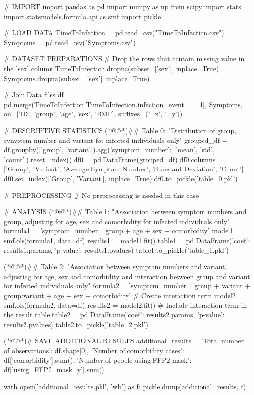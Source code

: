 \documentclass[11pt]{article}
\begin{document}
\begin{python}

# IMPORT
import pandas as pd
import numpy as np
from scipy import stats
import statsmodels.formula.api as smf
import pickle

# LOAD DATA
TimeToInfection = pd.read_csv("TimeToInfection.csv")
Symptoms = pd.read_csv("Symptoms.csv")

# DATASET PREPARATIONS
# Drop the rows that contain missing value in the 'sex' column
TimeToInfection.dropna(subset=['sex'], inplace=True)
Symptoms.dropna(subset=['sex'], inplace=True)

# Join Data files
df = pd.merge(TimeToInfection[TimeToInfection.infection_event == 1], Symptoms, on=['ID', 'group', 'age', 'sex', 'BMI'], suffixes=('_x', '_y'))

# DESCRIPTIVE STATISTICS
(*@@*)## Table 0: "Distribution of group, symptom number and variant for infected individuals only"
grouped_df = df.groupby(['group', 'variant']).agg({'symptom_number': ['mean', 'std', 'count']}).reset_index()
df0 = pd.DataFrame(grouped_df)
df0.columns = ['Group', 'Variant', 'Average Symptom Number', 'Standard Deviation', 'Count']
df0.set_index(['Group', 'Variant'], inplace=True)
df0.to_pickle('table_0.pkl')

# PREPROCESSING
# No preprocessing is needed in this case

# ANALYSIS
(*@@*)## Table 1: "Association between symptom numbers and group, adjusting for age, sex and comorbidity for infected individuals only"
formula1 = 'symptom_number ~ group + age + sex + comorbidity'
model1 = smf.ols(formula1, data=df)
results1 = model1.fit()
table1 = pd.DataFrame({'coef': results1.params, 'p-value': results1.pvalues})
table1.to_pickle('table_1.pkl')

(*@@*)## Table 2: "Association between symptom numbers and variant, adjusting for age, sex and comorbidity and interaction between group and variant for infected individuals only"
formula2 = 'symptom_number ~ group + variant + group:variant + age + sex + comorbidity' # Create interaction term
model2 = smf.ols(formula2, data=df)
results2 = model2.fit()
# Include interaction term in the result table
table2 = pd.DataFrame({'coef': results2.params, 'p-value': results2.pvalues})
table2.to_pickle('table_2.pkl')

(*@@*)# SAVE ADDITIONAL RESULTS
additional_results = {
    'Total number of observations': df.shape[0],
    'Number of comorbidity cases': df['comorbidity'].sum(),
    'Number of people using FFP2 mask': df['using_FFP2_mask_y'].sum()
}

with open('additional_results.pkl', 'wb') as f:
    pickle.dump(additional_results, f)

\end{python}
\end{document}

